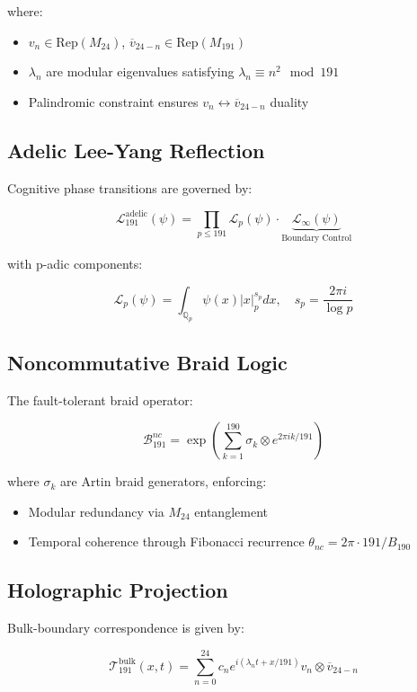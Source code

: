\documentclass[12pt]{article}
\begin{document}
\begin{center}
where:
\begin{itemize}
    \item $v_n \in \text{Rep}(M_{24})$, $\overline{v}_{24-n} \in \text{Rep}(M_{191})$ 
    \item $\lambda_n$ are modular eigenvalues satisfying $\lambda_n \equiv n^2 \mod 191$
    \item Palindromic constraint ensures $v_n \leftrightarrow \overline{v}_{24-n}$ duality
\end{itemize}

\subsection{Adelic Lee-Yang Reflection}
\label{subsec:lee-yang}

Cognitive phase transitions are governed by:

\[
\mathcal{L}_{191}^{\text{adelic}}(\psi) = \prod_{p \leq 191} \mathcal{L}_p(\psi) \cdot \underbrace{\mathcal{L}_\infty(\psi)}_{\text{Boundary Control}}
\]

with p-adic components:

\[
\mathcal{L}_p(\psi) = \int_{\mathbb{Q}_p} \psi(x) |x|_p^{s_p} dx, \quad s_p = \frac{2\pi i}{\log p}
\]

\subsection{Noncommutative Braid Logic}
\label{subsec:braid}

The fault-tolerant braid operator:

\[
\mathcal{B}_{191}^{nc} = \exp\left(\sum_{k=1}^{190} \sigma_k \otimes e^{2\pi i k/191}\right)
\]

where $\sigma_k$ are Artin braid generators, enforcing:
\begin{itemize}
    \item Modular redundancy via $M_{24}$ entanglement
    \item Temporal coherence through Fibonacci recurrence $\theta_{nc} = 2\pi \cdot 191/B_{190}$
\end{itemize}

\subsection{Holographic Projection}
\label{subsec:holography}

Bulk-boundary correspondence is given by:

\[
\mathcal{T}_{191}^{\text{bulk}}(x,t) = \sum_{n=0}^{24} c_n e^{i(\lambda_n t + x/191)} v_n \otimes \overline{v}_{24-n}
\]


\end{center}
\end{document}
